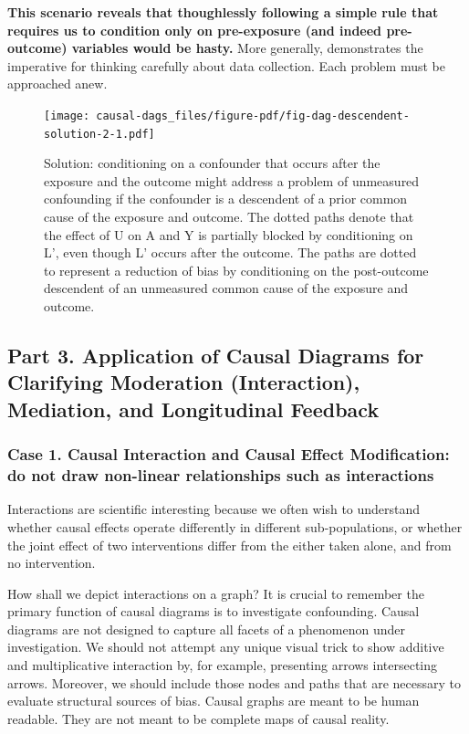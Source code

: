 \documentclass[
  singlecolumn,
  9pt]{article}
\begin{document}
\textbf{This scenario reveals that thoughlessly following a simple rule
that requires us to condition only on pre-exposure (and indeed
pre-outcome) variables would be hasty.} More generally, demonstrates the
imperative for thinking carefully about data collection. Each problem
must be approached anew.

\begin{figure}

{\centering \texttt{[image: causal-dags\_files/figure-pdf/fig-dag-descendent-solution-2-1.pdf]}

}

\caption{\label{fig-dag-descendent-solution-2}Solution: conditioning on
a confounder that occurs after the exposure and the outcome might
address a problem of unmeasured confounding if the confounder is a
descendent of a prior common cause of the exposure and outcome. The
dotted paths denote that the effect of U on A and Y is partially blocked
by conditioning on L', even though L' occurs after the outcome. The
paths are dotted to represent a reduction of bias by conditioning on the
post-outcome descendent of an unmeasured common cause of the exposure
and outcome.}

\end{figure}

\subsection{Part 3. Application of Causal Diagrams for Clarifying
Moderation (Interaction), Mediation, and Longitudinal
Feedback}\label{part-3.-application-of-causal-diagrams-for-clarifying-moderation-interaction-mediation-and-longitudinal-feedback}

\subsubsection{Case 1. Causal Interaction and Causal Effect
Modification: do not draw non-linear relationships such as
interactions}\label{case-1.-causal-interaction-and-causal-effect-modification-do-not-draw-non-linear-relationships-such-as-interactions}

Interactions are scientific interesting because we often wish to
understand whether causal effects operate differently in different
sub-populations, or whether the joint effect of two interventions differ
from the either taken alone, and from no intervention.

How shall we depict interactions on a graph? It is crucial to remember
the primary function of causal diagrams is to investigate confounding.
Causal diagrams are not designed to capture all facets of a phenomenon
under investigation. We should not attempt any unique visual trick to
show additive and multiplicative interaction by, for example, presenting
arrows intersecting arrows. Moreover, we should include those nodes and
paths that are necessary to evaluate structural sources of bias. Causal
graphs are meant to be human readable. They are not meant to be complete
maps of causal reality.
\end{document}
